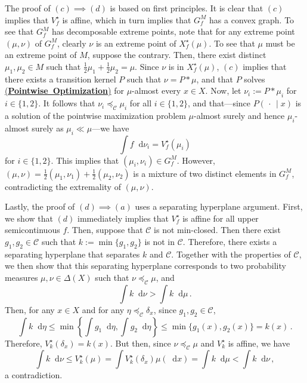 \documentclass[12pt,letterpaper]{article}
\newenvironment{original}{\color{black}}{}
\theoremstyle{plain}
\theoremstyle{definition}
\theoremstyle{remark}
\newcommand{\C}{\mathcal{C}}
\renewcommand*\d{\mathop{}\!\mathrm{d}}
\theoremstyle{definition}
\DeclareRobustCommand{\weqref}[2]{
  \leavevmode\nobreak\hbox{\hyperlink{#2}{\textup{(#1)}}}
}
\begin{document}
\begin{original}
The proof of $(c) \implies (d)$ is based on first principles. It is clear that $(c)$ implies that $V_f^\star$ is affine, which in turn implies that $G_f^M$ has a convex graph. To see that $G_f^M$ has decomposable extreme points, note that for any extreme point $(\mu,\nu)$ of $G^M_f$, clearly $\nu$ is an extreme point of $X^\star_f(\mu)$. To see that $\mu$ must be an extreme point of $M$, suppose the contrary. Then, there exist distinct $\mu_1,\mu_2 \in M$ such that $\frac{1}{2}\mu_1+\frac{1}{2}\mu_2=\mu$. Since $\nu$ is in $X^\star_f(\mu)$, $(c)$ implies that there exists a transition kernel $P$ such that $\nu=P*\mu$, and that $P$ solves \weqref{\textbf{Pointwise Optimization}}{eq:pointwise} for $\mu$-almost every $x \in X$. Now, let $\nu_i:=P*\mu_i$ for $i\in \{1,2\}$. It follows that $\nu_i \preceq_\C \mu_i$ for all $i \in \{1,2\}$, and that---since $P(\,\cdot\,\mid x)$ is a solution of the pointwise maximization problem $\mu$-almost surely and hence $\mu_i$-almost surely as $\mu_i \ll \mu$---we have
\[
\int f \d \nu_i=V_f^\star(\mu_i)
\]
for $i \in \{1,2\}$. This implies that $(\mu_i,\nu_i) \in G_f^M$. However,  $(\mu,\nu) = \frac{1}{2}(\mu_1,\nu_1)+\frac{1}{2}(\mu_2,\nu_2)$ is a mixture of two distinct elements in $G_f^M$, contradicting the extremality of $(\mu,\nu)$.

Lastly, the proof of $(d) \implies (a)$ uses a separating hyperplane argument. First, we show that $(d)$ immediately implies that $V^\star_f$ is affine for all upper semicontinuous $f$. Then, suppose that $\C$ is not min-closed. Then there exist $g_1,g_2 \in \C$ such that $k:=\min\{g_1,g_2\}$ is not in $\C$. Therefore, there exists a separating hyperplane that separates $k$ and $\C$. Together with the properties of $\C$, we then show that this separating hyperplane corresponds to two probability measures $\mu,\nu \in \Delta(X)$ such that $\nu \preceq_\C \mu$, and
\[
\int k \d \nu>\int k \d \mu\,.
\]
Then, for any $x \in X$ and for any $\eta \preceq_\C \delta_x$, since $g_1,g_2 \in \C$,
\[
\int k \d \eta \leq \min\left\{\int g_1 \d \eta, \int g_2 \d \eta\right\} \leq \min\{g_1(x),g_2(x)\}=k(x)\,.
\]
Therefore, $V^\star_k(\delta_x)=k(x)$. But then, since $\nu \preceq_\C \mu$ and $V^\star_k$ is affine, we have
\[
\int k \d \nu \leq V^\star_k(\mu) =\int V_k^\star(\delta_x) \mu(\d x)=\int k \d \mu< \int k \d \nu\,,
\]
a contradiction.
\end{original}
\end{document}
